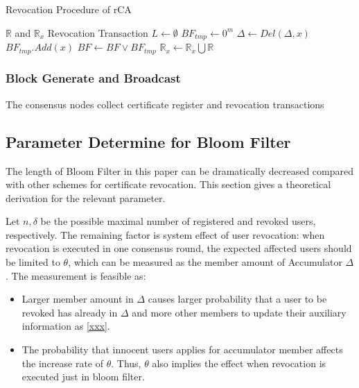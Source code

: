 \documentclass[conference]{IEEEtran}
\begin{document}
\begin{algorithm}
\renewcommand{\algorithmicensure}{\textbf{Output:}}
	\caption{Revocation Procedure of rCA}\label{alg:cap}
	\begin{algorithmic}[1]
		\Require $\mathbb{R}$ and $\mathbb{R}_x$ %
		\Ensure Revocation Transaction
		\State $L\gets \emptyset$
		\State $BF_{tmp} \gets 0^m$ 
		\State $\Delta \gets Del(\Delta, x)$ 
		\Else
		\State $BF_{tmp}.Add(x)$
		\EndIf
		\EndFor
		\State $BF \gets BF \lor BF_{tmp}$
		\State $\mathbb{R}_x \gets \mathbb{R}_x \bigcup \mathbb{R} $
	\end{algorithmic}
\end{algorithm}

\subsubsection{Block Generate and Broadcast}
The consensus nodes collect certificate register and revocation transactions 
\subsection{Parameter Determine for Bloom Filter}

The length of Bloom Filter in this paper can be dramatically decreased compared with other schemes for certificate revocation. This section gives a theoretical derivation for the relevant parameter.

Let $n, \delta$ be the possible maximal number of registered and revoked users, respectively. The remaining factor is system effect of user revocation: when revocation is executed in one consensus round, the expected affected users should be limited to $\theta$, which can be measured as the member amount of Accumulator $\Delta$. The measurement is feasible as:
\begin{itemize}
    \item Larger member amount in $\Delta$ causes larger probability that a user to be revoked has already in $\Delta$ and more other members to update their auxiliary information as \eqref{xxx}.
    \item The probability that innocent users applies for accumulator member affects the increase rate of $\theta$. Thus, $\theta$ also implies the effect when revocation is executed just in bloom filter.
\end{itemize}
\end{document}
